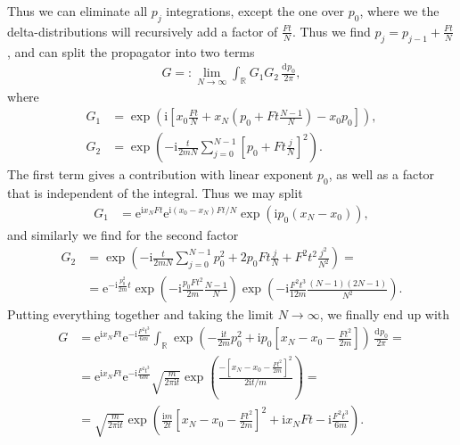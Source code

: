 \documentclass[english, parskip=full]{scrartcl}
\newcommand{\intr}{}
\newcommand{\kla}{}
\newcommand{\klam}{}
\renewcommand{\i}{\text{i}}
\newcommand{\e}{\text{e}}
\begin{document}
Thus we can eliminate all $p_j$ integrations, except the one over $p_0$, where we the delta-distributions will recursively add a factor of $\frac{Ft}{N}$.
Thus we find $p_j = p_{j-1} + \frac{Ft}{N}$, and can split the propagator into two terms 
\begin{align}
G =: \lim_{N\rightarrow \infty } \intr\int_{\mathbb{R}^{ }} G_1G_2 \,\frac{ \mathrm{d}^{ }p_0}{2\pi},
\end{align}
where 
\begin{align}
G_1 &= \exp\kla\left( \i\klam\left[ x_0\frac{Ft}{N} + x_N\kla\left( p_0 + Ft\frac{N-1}{N} \right) - x_0p_0 \right]\right),\\
G_2 &=  \exp\kla\left( -\i\frac{t}{2mN}\sum_{j=0}^{N-1}\klam\left[ p_0 + Ft\frac{j}{N} \right]^2 \right).
\end{align}
The first term gives a contribution with linear exponent $p_0$, as well as a factor that is independent of the integral.
Thus we may split
\begin{align}
G_1 &= \e^{\i x_NFt}\e^{\i (x_0 - x_N) Ft/N} \exp\kla\left( \i p_0 (x_N - x_0) \right),
\end{align}
and similarly we find for the second factor
\begin{align}
G_2 &= \exp\kla\left( -\i\frac{t}{2mN}\sum_{j=0}^{N-1}p_0^2 + 2p_0 Ft\frac{j}{N} + F^2t^2\frac{j^2}{N^2} \right) = \\
&= \e^{-\i\frac{p_0^2}{2m}t} \exp\kla\left( -\i \frac{p_0Ft^2}{2m}\frac{N-1}{N} \right)\exp\kla\left( -\i\frac{F^2t^3}{12m}\frac{(N-1)(2N - 1)}{N^2} \right).
\end{align}
Putting everything together and taking the limit $N\rightarrow\infty$, we finally end up with
\begin{align}
G &= \e^{\i x_N Ft}\e^{-\i\frac{F^2t^3}{6m}}\intr\int_{\mathbb{R}^{ }} \exp\kla\left( -\frac{\i t}{2m}p_0^2 + \i p_0\klam\left[ x_N - x_0 - \frac{Ft^2}{2m} \right] \right) \,\frac{ \mathrm{d}^{ }p_0}{2\pi} = \\
&= \e^{\i x_N Ft}\e^{-\i\frac{F^2t^3}{6m}} \sqrt{\frac{m}{2\pi\i t}} \exp\kla\left( \frac{-\klam\left[ x_N - x_0 - \frac{Ft^2}{2m} \right]^2}{2\i t / m} \right) = \\
&= \sqrt{\frac{m}{2\pi\i t}} \exp\kla\left( \frac{\i m}{2t}\klam\left[ x_N - x_0 - \frac{Ft^2}{2m} \right]^2 + \i x_NFt - \i\frac{F^2t^3}{6m}\right).
\end{align}
\end{document}
